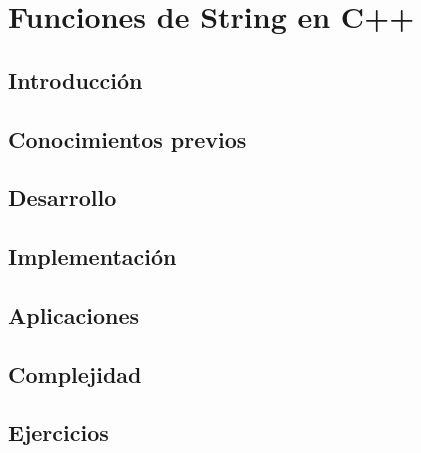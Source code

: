\chapter{Funciones de String en C++}
\section{Introducción}

\section{Conocimientos previos}

\section{Desarrollo}

\section{Implementación}

\section{Aplicaciones}

\section{Complejidad}

\section{Ejercicios}
